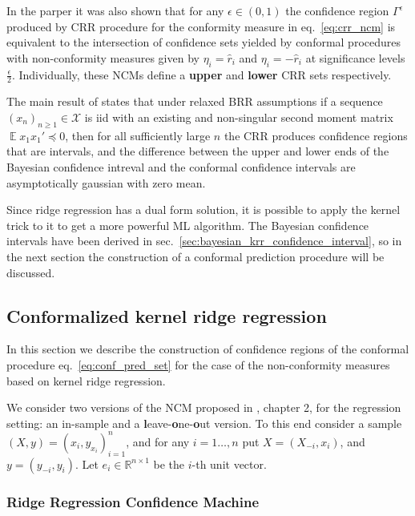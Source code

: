 \documentclass{ITaSconf}
\newcommand{\ex}{\mathop{\mathbb{E}}\nolimits}
\newcommand{\Xcal}{\mathcal{X}}
\newcommand{\Real}{\mathbb{R}}
\begin{document}
In the parper it was also shown that for any $\epsilon\in(0,1)$ the confidence
region $\Gamma^\epsilon$ produced by CRR procedure for the conformity measure in
eq.~\ref{eq:crr_ncm} is equivalent to the intersection of confidence sets yielded
by conformal procedures with non-conformity measures given by $\eta_i = \hat{r}_i$
and $\eta_i = -\hat{r}_i$ at significance levels $\frac{\epsilon}{2}$. Individually,
these NCMs define a \textbf{upper} and \textbf{lower} CRR sets respectively.

The main result of \cite{BurVovk2014} states that under relaxed BRR assumptions if
a sequence $(x_n)_{n\geq1}\in\Xcal$ is iid with an existing and non-singular second
moment matrix $\ex x_1x_1' \preceq 0$, then for all sufficiently large $n$ the CRR
produces confidence regions that are intervals, and the difference between the upper
and lower ends of the Bayesian confidence intreval and the conformal confidence
intervals are asymptotically gaussian with zero mean.

Since ridge regression has a dual form solution, it is possible to apply the kernel
trick to it to get a more powerful ML algorithm. The Bayesian confidence intervals
have been derived in sec.~\ref{sec:bayesian_krr_confidence_interval}, so in the next
section the construction of a conformal prediction procedure will be discussed.


\subsection{Conformalized kernel ridge regression} %
\label{sub:conformalized_krr}

In this section we describe the construction of confidence regions of the conformal
procedure eq.~\ref{eq:conf_pred_set} for the case of the non-conformity measures
based on kernel ridge regression.

We consider two versions of the NCM proposed in \cite{vovk2005}, chapter 2,
for the regression setting: an in-sample and a \textbf{l}eave-\textbf{o}ne-\textbf{o}ut
version. To this end consider a sample $(X, y) = (x_i, y_{x_i})_{i=1}^n$, and for
any $i=1\ldots, n$ put $X = (X_{-i}, x_i)$, and $y = (y_{-i}, y_i)$.
Let $e_i\in \Real^{n\times 1}$ be the $i$-th unit vector.

\subsubsection{Ridge Regression Confidence Machine} %
\label{ssub:ridge_regression_confidence_machine}
\end{document}
